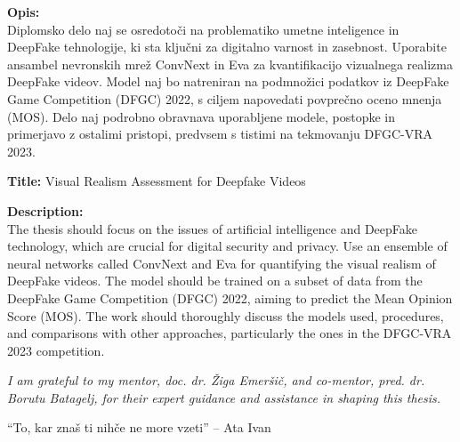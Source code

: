 \documentclass[a4paper,12pt,openright]{book}
\newcommand{\clearemptydoublepage}{\newpage{\pagestyle{empty}\cleardoublepage}}
\begin{document}
\bigskip
\noindent\textbf{Opis:}\\
Diplomsko delo naj se osredotoči na problematiko umetne inteligence in DeepFake tehnologije, ki sta ključni za digitalno varnost in zasebnost. Uporabite ansambel nevronskih mrež ConvNext in Eva za kvantifikacijo vizualnega realizma DeepFake videov. Model naj bo natreniran na podmnožici podatkov iz DeepFake Game Competition (DFGC) 2022, s ciljem napovedati povprečno oceno mnenja (MOS). Delo naj podrobno obravnava uporabljene modele, postopke in primerjavo z ostalimi pristopi, predvsem s tistimi na tekmovanju DFGC-VRA 2023.


\bigskip
\noindent\textbf{Title:} Visual Realism Assessment for Deepfake Videos

\bigskip
\noindent\textbf{Description:}\\
The thesis should focus on the issues of artificial intelligence and DeepFake technology, which are crucial for digital security and privacy. Use an ensemble of neural networks called ConvNext and Eva for quantifying the visual realism of DeepFake videos. The model should be trained on a subset of data from the DeepFake Game Competition (DFGC) 2022, aiming to predict the Mean Opinion Score (MOS). The work should thoroughly discuss the models used, procedures, and comparisons with other approaches, particularly the ones in the DFGC-VRA 2023 competition.

\vfill



\vspace{2cm}

\clearemptydoublepage

\thispagestyle{empty}\mbox{}\vfill\null\it%
\noindent
I am grateful to my mentor, doc. dr. Žiga Emeršič, and co-mentor, pred. dr. Borutu Batagelj, for their expert guidance and assistance in shaping this thesis.
\rm\normalfont

\clearemptydoublepage

\thispagestyle{empty}\mbox{}{\textheight}\mbox{}\hfill\begin{minipage}{0.55\textwidth}%
``To, kar znaš ti nihče ne more vzeti'' -- Ata Ivan

\normalfont\end{minipage}

\clearemptydoublepage

\pagestyle{empty}
\def\thepage{}%
\tableofcontents{}
\end{document}
